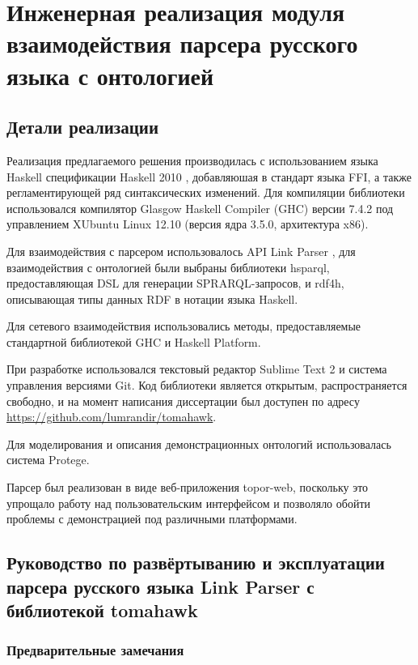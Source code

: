 \indent \section{Инженерная реализация модуля взаимодействия парсера русского языка с онтологией}

\subsection{Детали реализации}

Реализация предлагаемого решения производилась с использованием языка Haskell спецификации Haskell 2010 \cite{haskell2010}, добавляюшая в стандарт языка FFI, а также регламентирующей ряд синтаксических изменений. Для компиляции библиотеки использовался компилятор Glasgow Haskell Compiler (GHC) версии 7.4.2 под управлением XUbuntu Linux 12.10 (версия ядра 3.5.0, архитектура x86).

Для взаимодействия с парсером использовалось API Link Parser \cite{api}, для взаимодействия с онтологией были выбраны библиотеки hsparql, предоставляющая DSL для генерации SPRARQL-запросов, и rdf4h, описывающая типы данных RDF в нотации языка Haskell.

Для сетевого взаимодействия использовались методы, предоставляемые стандартной библиотекой GHC и Haskell Platform.

При разработке использовался текстовый редактор Sublime Text 2 и система управления версиями Git. Код библиотеки является открытым, распространяется свободно, и на момент написания диссертации был доступен по адресу \url{https://github.com/lumrandir/tomahawk}.

Для моделирования и описания демонстрационных онтологий использовалась система Protege.

Парсер был реализован в виде веб-приложения topor-web, поскольку это упрощало работу над пользовательским интерфейсом и позволяло обойти проблемы с демонстрацией под различными платформами.

\subsection{Руководство по развёртыванию и эксплуатации парсера русского языка Link Parser с библиотекой tomahawk}

\subsubsection{Предварительные замечания}

